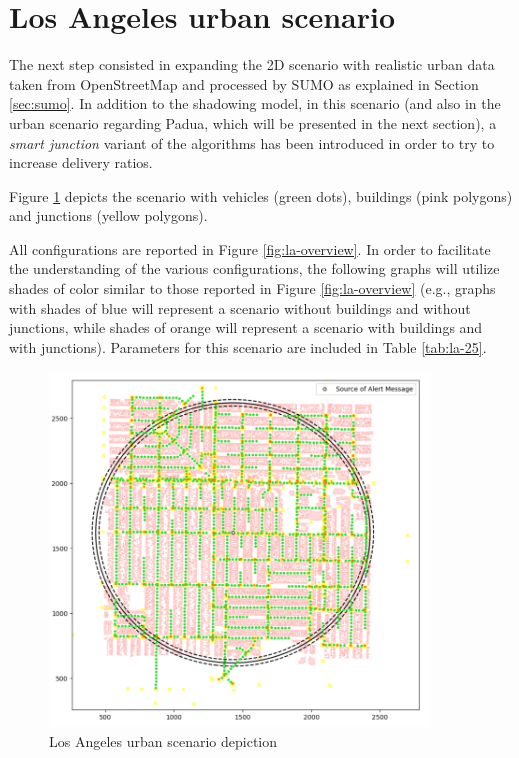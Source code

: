	\section{Los Angeles urban scenario}
		\label{sec:la-scenario}
		The next step consisted in expanding the 2D scenario with realistic urban data taken from OpenStreetMap and processed by SUMO as explained in Section \ref{sec:sumo}. In addition to the shadowing model, in this scenario (and also in the urban scenario regarding Padua, which will be presented in the next section), a \textit{smart junction} variant of the algorithms has been introduced in order to try to increase delivery ratios. 
		
		Figure \ref{fig:la-scenario} depicts the scenario with vehicles (green dots), buildings (pink polygons) and junctions (yellow polygons).
		
		
		All configurations are reported in Figure \ref{fig:la-overview}. In order to facilitate the understanding of the various configurations, the following graphs will utilize shades of color similar to those reported in Figure \ref{fig:la-overview} (e.g., graphs with shades of blue will represent a scenario without buildings and without junctions, while shades of orange will represent a scenario with buildings and with junctions). Parameters for this scenario are included in Table \ref{tab:la-25}.  
		
		\begin{figure}[H]
			\centering
			\includegraphics[width=0.90\textwidth]{immagini/la-25/la-scenario}
			\caption{Los Angeles urban scenario depiction}
			\label{fig:la-scenario}
		\end{figure}
		
